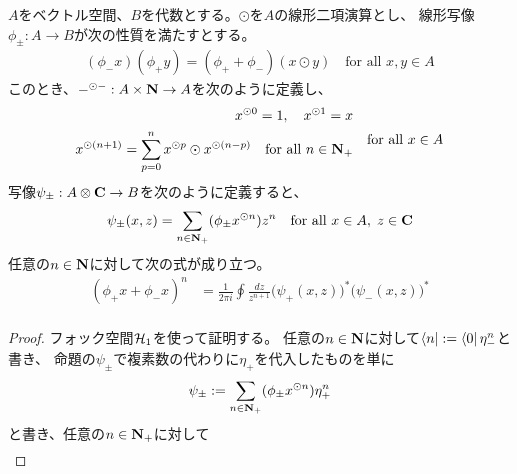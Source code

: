 {	\begin{proposition}[二項演算]\label{prop:二項演算} %
		$A$をベクトル空間、$B$を代数とする。$\odot$を$A$の線形二項演算とし、
		線形写像$\phi_\pm:A\to B$が次の性質を満たすとする。
		\begin{equation*}\begin{split}
			(\phi_-x)(\phi_+y) = (\phi_+ + \phi_-)(x\odot y)
			\quad\text{for all } x,y\in A
		\end{split}\end{equation*}
		このとき、$-^{\odot-}:A\times\mathbf{N}\to A$を次のように定義し、
		\begin{equation*}\begin{split}
			x^{\odot 0} = 1,\quad x^{\odot 1} = x \\
			x^{\odot(n+1)} = \sum_{p=0}^n x^{\odot p}\odot x^{\odot(n-p)}
			\quad\text{for all } n\in\mathbf{N}_+ \\
		\end{split}
			\quad\text{for all }x\in A
		\end{equation*}
		写像$\psi_\pm:A\otimes\mathbf{C}\to B$を次のように定義すると、
		\begin{equation*}\begin{split}
			\psi_\pm(x,z) = \sum_{n\in\mathbf{N}_+}(\phi_\pm x^{\odot n})z^n
			\quad\text{for all } x\in A,\; z\in\mathbf{C}
		\end{split}\end{equation*}
		任意の$n\in\mathbf{N}$に対して次の式が成り立つ。
		\begin{equation*}\begin{split}
			(\phi_+x + \phi_-x)^n &= \frac{1}{2\pi i} \oint \frac{dz}{z^{n+1}} 
				\bigl(\psi_+(x,z)\bigr)^*\bigl(\psi_-(x,z)\bigr)^* \\
		\end{split}\end{equation*}
	\end{proposition} %
	\begin{proof} %
		フォック空間${{\mathcal{H}}}_1$を使って証明する。
		任意の$n\in\mathbf{N}$に対して$\mathinner{\langle{n}|}:=\mathinner{\langle{0}|}\eta_-^n$と書き、
		命題の$\psi_\pm$で複素数の代わりに$\eta_+$を代入したものを単に
		\begin{equation*}\begin{split}
			\psi_\pm := \sum_{n\in\mathbf{N}_+}(\phi_\pm x^{\odot n})\eta_+^n
		\end{split}\end{equation*}
		と書き、任意の$n\in\mathbf{N}_+$に対して
		\begin{equation*}\begin{split}

\end{split}
\end{equation*}
\end{proof}}
